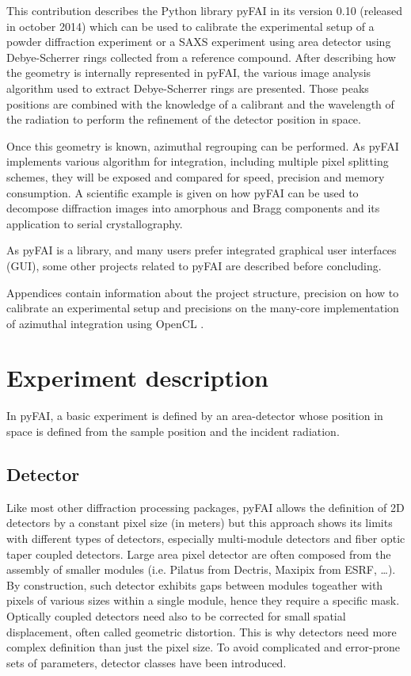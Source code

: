 \documentclass[preprint]{iucr}
\begin{document}
This contribution describes the Python library pyFAI in its version 0.10
(released in october 2014) which can be used to calibrate the experimental
setup of a powder diffraction experiment or a SAXS experiment using area
detector using Debye-Scherrer rings collected from a reference compound.
After describing how the geometry is internally represented in pyFAI, the
various image analysis algorithm used to extract Debye-Scherrer rings are presented.
Those peaks positions are combined with the knowledge of a calibrant and the
wavelength of the radiation to perform the refinement of the detector position
in space.

Once this geometry is known, azimuthal regrouping can be performed.
As pyFAI implements various algorithm for integration, including
multiple pixel splitting schemes, they will be exposed and compared
for speed, precision and memory consumption.
A scientific example is given on how pyFAI can be used to decompose
diffraction images into amorphous and Bragg components and its application
to serial crystallography.

As pyFAI is a library, and many users prefer  integrated graphical user
interfaces (GUI), some other projects related to pyFAI are described before
concluding.

Appendices contain information about the project structure, precision
on how to calibrate an experimental setup and precisions on the many-core
implementation of azimuthal integration using OpenCL \cite{opencl}.

\section{Experiment description}

In pyFAI, a basic experiment is defined by an area-detector whose position
in space is defined from the sample position and the incident radiation.

\subsection{Detector}
Like most other diffraction processing packages, pyFAI allows the definition of
2D detectors by a constant pixel size (in meters) but this approach shows its limits
with different types of detectors, especially multi-module detectors and fiber
optic taper coupled detectors. 
Large area pixel detector are often composed from
the assembly of smaller modules (i.e. Pilatus from Dectris, Maxipix from ESRF,
\ldots).
By construction, such detector exhibits gaps between modules togeather with
pixels of various sizes within a single module, hence they require a specific mask.
Optically coupled detectors need also to be corrected
for small spatial displacement, often called geometric distortion.
This is why detectors need more complex definition than just the pixel size. 
To avoid complicated and error-prone sets of parameters, detector classes have
been introduced.
\end{document}
